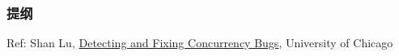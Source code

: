 % 
% 
% 
% 
% 
% 
% 
% 
\begin{frame}
\frametitle{提纲} %
\tableofcontents %

Ref: Shan Lu, \href{https://s4plus.ustc.edu.cn/_upload/article/files/84/48/964812c049829f4538793b862187/430bcb14-7aa7-4689-b340-9c81e735e5eb.pdf}{Detecting and Fixing Concurrency Bugs}, University of Chicago

\end{frame}

